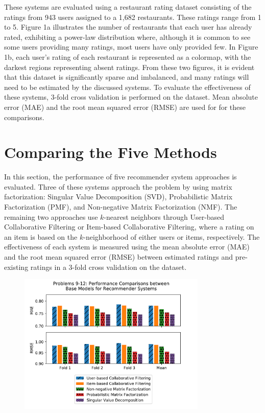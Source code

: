 \documentclass[11pt]{article}
\begin{document}
These systems are evaluated using a restaurant rating dataset consisting of the ratings from 943 users assigned to a 1,682 restaurants.
These ratings range from 1 to 5.
Figure 1a illustrates the number of restaurants that each user has already rated, exhibiting a power-law distribution where, although it is common to see some users providing many ratings, most users have only provided few.
In Figure 1b, each user's rating of each restaurant is represented as a colormap, with the darkest regions representing absent ratings.
From these two figures, it is evident that this dataset is significantly sparse and imbalanced, and many ratings will need to be estimated by the discussed systems.
To evaluate the effectiveness of these systems, 3-fold cross validation is performed on the dataset.%
Mean absolute error (MAE) and the root mean squared error (RMSE) are used for for these comparisons.


\section{Comparing the Five Methods} \label{sec:experiments}

In this section, the performance of five recommender system approaches is evaluated.
Three of these systems approach the problem by using matrix factorization: Singular Value Decomposition (SVD), Probabilistic Matrix Factorization (PMF), and Non-negative Matrix Factorization (NMF).
The remaining two approaches use $k$-nearest neighbors through User-based Collaborative Filtering or Item-based Collaborative Filtering, where a rating on an item is based on the $k$-neighborhood of either users or items, respectively.
The effectiveness of each system is measured using the mean absolute error (MAE) and the root mean squared error (RMSE) between estimated ratings and pre-existing ratings in a 3-fold cross validation on the dataset.


\begin{figure}[h!] \label{fig:threefoldcross}
  \centering
  \includegraphics[width=0.8\textwidth]{rmse_mae_comp}
  \caption{}
\end{figure}
\end{document}
